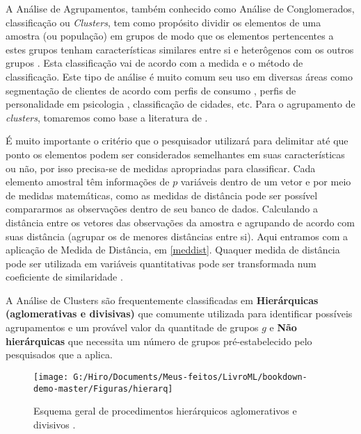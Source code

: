 \documentclass[
  openany]{book}
\begin{document}
A Análise de Agrupamentos, também conhecido como Análise de Conglomerados, classificação ou \emph{Clusters}, tem como propósito dividir os elementos de uma amostra (ou população) em grupos de modo que os elementos pertencentes a estes grupos tenham características similares entre si e heterôgenos com os outros grupos \citep{mingoti2007analise}. Esta classificação vai de acordo com a medida e o método de classificação. Este tipo de análise é muito comum seu uso em diversas áreas como segmentação de clientes de acordo com perfis de consumo \citep{punj1983cluster}, perfis de personalidade em psicologia \citep{speece1985classification}, classificação de cidades, etc. Para o agrupamento de \emph{clusters}, tomaremos como base a literatura de \citet{mingoti2007analise}.

É muito importante o critério que o pesquisador utilizará para delimitar até que ponto os elementos podem ser considerados semelhantes em suas características ou não, por isso precisa-se de medidas apropriadas para classificar. Cada elemento amostral têm informações de \(p\) variáveis dentro de um vetor e por meio de medidas matemáticas, como as medidas de distância pode ser possível compararmos as observações dentro de seu banco de dados. Calculando a distância entre os vetores das observações da amostra e agrupando de acordo com suas distância (agrupar os de menores distâncias entre si). Aqui entramos com a aplicação de Medida de Distância, em \ref{meddist}. Quaquer medida de distância pode ser utilizada em variáveis quantitativas pode ser transformada num coeficiente de similaridade \citep{mingoti2007analise}.

A Análise de Clusters são frequentemente classificadas em \textbf{Hierárquicas (aglomerativas e divisivas)} que comumente utilizada para identificar possíveis agrupamentos e um provável valor da quantitade de grupos \(g\) e \textbf{Não hierárquicas} que necessita um número de grupos pré-estabelecido pelo pesquisados que a aplica.

\begin{figure}

{\centering \texttt{[image: G:/Hiro/Documents/Meus-feitos/LivroML/bookdown-demo-master/Figuras/hierarq]} 

}

\caption{Esquema geral de procedimentos hierárquicos aglomerativos e divisivos \citep{mingoti2007analise}.}\label{fig:hierarq}
\end{figure}
\end{document}
